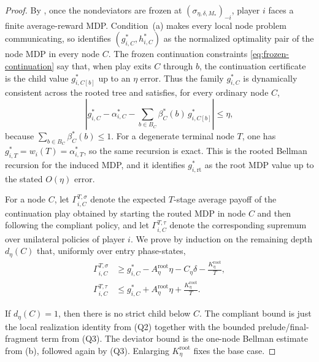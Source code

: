 \documentclass[12pt]{article}
\theoremstyle{definition}
\newcommand{\1}{\mathbf{1}}
\begin{document}
\begin{proof}
By , once the nondeviators are frozen at
$(\sigma_{\eta,\delta,M_*})_{-i}$, player $i$ faces a finite average-reward MDP.
Condition~\textnormal{(a)} makes every local node problem communicating, so
 identifies $(g_{i,C}^*,h_{i,C}^*)$ as the normalized
optimality pair of the node MDP in every node $C$. The frozen continuation
constraints \eqref{eq:frozen-continuation} say that, when play exits $C$ through
$b$, the continuation certificate is the child value $g_{i,C[b]}^*$ up to an
$\eta$ error. Thus the family $g_{i,C}^*$ is dynamically consistent across the
rooted tree and satisfies, for every ordinary node $C$,
\begin{equation}
\label{eq:root-benchmark-recursion}
\left|
g_{i,C}^*
-
\alpha_{i,C}^*
-
\sum_{b\in B_C}\beta_C^*(b)\,g_{i,C[b]}^*
\right|
\le \eta,
\end{equation}
because $\sum_{b\in B_C}\beta_C^*(b)\le 1$. For a degenerate terminal node $T$,
one has $g_{i,T}^*=w_i(T)=\alpha_{i,T}^*$, so the same recursion is exact. This
is the rooted Bellman recursion for the induced MDP, and it identifies
$g_{i,\mathrm{rt}}^*$ as the root MDP value up to the stated $O(\eta)$ error.

For a node $C$, let $\Gamma_{i,C}^{T,\sigma}$ denote the expected $T$-stage
average payoff of the continuation play obtained by starting the routed MDP in
node $C$ and then following the compliant policy, and let $\Gamma_{i,C}^{T,\tau}$
denote the corresponding supremum over unilateral policies of player $i$. We
prove by induction on the remaining depth $d_\eta(C)$ that, uniformly over entry
phase-states,
\begin{align}
\Gamma_{i,C}^{T,\sigma}
&\ge
g_{i,C}^* - A_\eta^{\mathrm{root}}\eta - C_\eta\delta - \frac{K_\eta^{\mathrm{root}}}{T},
\label{eq:root-compliant-node}
\\
\Gamma_{i,C}^{T,\tau}
&\le
g_{i,C}^* + A_\eta^{\mathrm{root}}\eta + \frac{K_\eta^{\mathrm{root}}}{T}.
\label{eq:root-deviator-node}
\end{align}

If $d_\eta(C)=1$, then there is no strict child below $C$. The compliant bound is
just the local realization identity from \textnormal{(Q2)}
together with the bounded prelude/final-fragment term from
\textnormal{(Q3)}. The deviator bound is the one-node
Bellman estimate from \textnormal{(b)}, followed again by
\textnormal{(Q3)}. Enlarging $K_\eta^{\mathrm{root}}$ fixes
the base case.


\end{proof}
\end{document}
